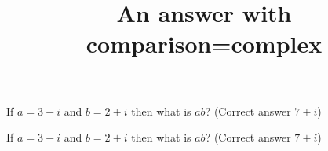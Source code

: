 \documentclass[onepage,submit]{webquiz}
\title{An answer with comparison=complex}
\begin{document}
  \begin{question}     %
     If $a=3-i$ and $b=2+i$ then what is $ab$?
      (Correct answer $7+i$)
  \end{question}
  \begin{question}     %
     If $a=3-i$ and $b=2+i$ then what is $ab$?
      (Correct answer $7+i$)
  \end{question}
\end{document}
